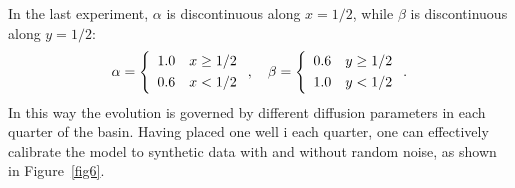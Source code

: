 In the last experiment, $\alpha$ is discontinuous along $x=1/2$, while
$\beta$ is discontinuous along $y=1/2$:
\begin{equation}
 \alpha = \left\{
 \begin{array}{rl} 1.0 & x \ge 1/2 \\[\jot] 0.6 & x < 1/2 \end{array}
 \right .
 , \quad
 \beta = \left\{
 \begin{array}{rl} 0.6 & y \ge 1/2 \\[\jot] 1.0 & y < 1/2 \end{array}
 \right .
 .
\end{equation}
In this way the evolution is governed by different diffusion parameters
in each quarter of the basin.  Having placed one well i each quarter,
one can effectively calibrate the model to synthetic data with and
without random noise, as shown in Figure~\ref{fig6}.

